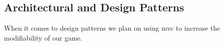 \subsection{Architectural and Design Patterns}

When it comes to design patterns we plan on using mvc to increase the modifiability of our game.